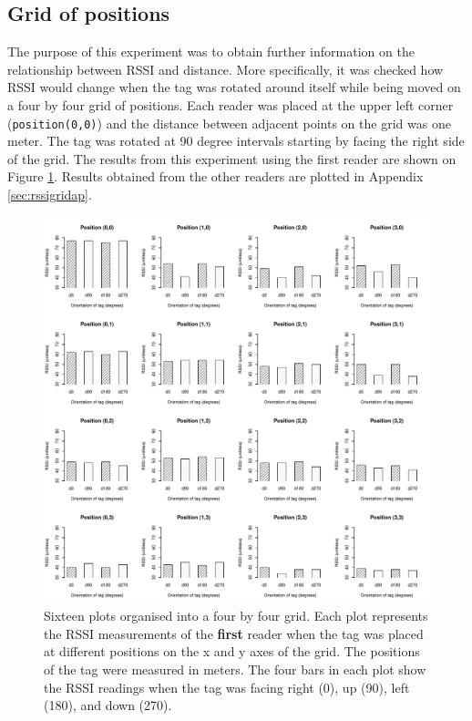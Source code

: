 \subsection{Grid of positions}

The purpose of this experiment was to obtain further information on the relationship between RSSI and distance. More specifically, it was checked how RSSI would change when the tag was rotated around itself while being moved on a four by four grid of positions. Each reader was placed at the upper left corner (\verb!position(0,0)!) and the distance between adjacent points on the grid was one meter. The tag was rotated at 90 degree intervals starting by facing the right side of the grid. The results from this experiment using the first reader are shown on Figure \ref{fig:rssigrid}. Results obtained from the other readers are plotted in Appendix \ref{sec:rssigridap}.
\begin{figure}[H]
	\begin{center}
		\includegraphics[width=1\textwidth]{figures/rssi_distance_grid_r1}
		\caption{Sixteen plots organised into a four by four grid. Each plot represents the RSSI measurements of the \textbf{first} reader when the tag was placed at different positions on the x and y axes of the grid. The positions of the tag were  measured in meters. The four bars in each plot show the RSSI readings when the tag was facing right (0\textdegree), up (90\textdegree), left (180\textdegree), and down (270\textdegree).}
		\label{fig:rssigrid}
	\end{center}
\end{figure}

